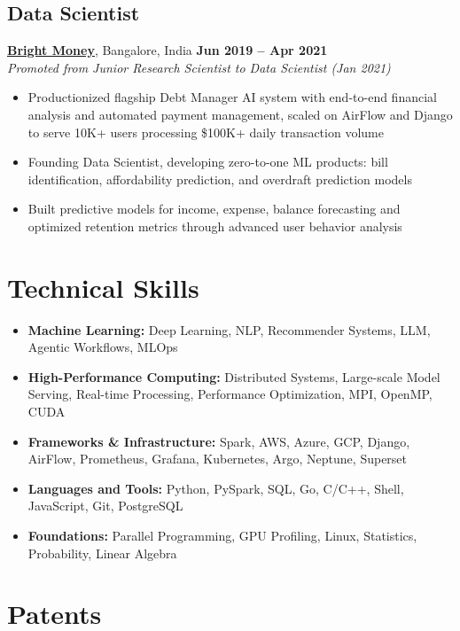 \documentclass[11pt,letterpaper]{article}
\let\oldhref\href
\renewcommand{\href}[2]{\uline{\oldhref{#1}{#2}}}
\begin{document}
\subsection{Data Scientist}
\noindent\textbf{\href{https://www.brightmoney.co/}{Bright Money}}, Bangalore, India \hfill \textbf{Jun 2019 -- Apr 2021} \\
\textit{Promoted from Junior Research Scientist to Data Scientist (Jan 2021)}
\begin{itemize}
    \item Productionized flagship Debt Manager AI system with end-to-end financial analysis and automated payment management, scaled on AirFlow and Django to serve 10K+ users processing \$100K+ daily transaction volume
    \item Founding Data Scientist, developing zero-to-one ML products: bill identification, affordability prediction, and overdraft prediction models
    \item Built predictive models for income, expense, balance forecasting and optimized retention metrics through advanced user behavior analysis
\end{itemize}

\newpage

\section{Technical Skills}

\begin{itemize}
    \item \textbf{Machine Learning:} Deep Learning, NLP, Recommender Systems, LLM, Agentic Workflows, MLOps
    \item \textbf{High-Performance Computing:} Distributed Systems, Large-scale Model Serving, Real-time Processing, Performance Optimization, MPI, OpenMP, CUDA
    \item \textbf{Frameworks \& Infrastructure:} Spark, AWS, Azure, GCP, Django, AirFlow, Prometheus, Grafana, Kubernetes, Argo, Neptune, Superset
    \item \textbf{Languages and Tools:} Python, PySpark, SQL, Go, C/C++, Shell, JavaScript, Git, PostgreSQL
    \item \textbf{Foundations:} Parallel Programming, GPU Profiling, Linux, Statistics, Probability, Linear Algebra
\end{itemize}

\section{Patents}
\end{document}
